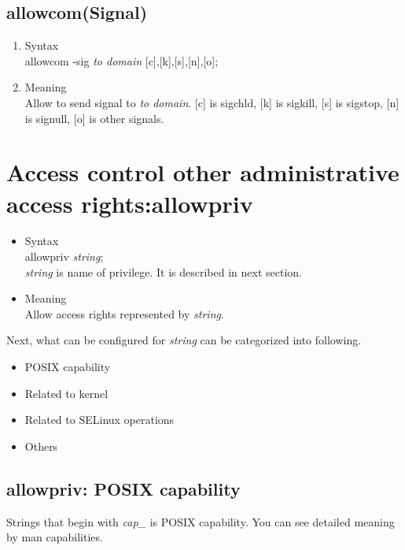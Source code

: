 \documentclass{article}
\begin{document}
\subsection{allowcom(Signal)}
\begin{enumerate}
 \item Syntax\\
       allowcom -sig {\it to domain} [c],[k],[s],[n],[o];
 \item Meaning\\
       Allow to send signal to {\it to domain}. [c] is sigchld, [k] is
       sigkill, [s] is sigstop, [n] is signull, [o] is other signals. 
\end{enumerate}



\section{Access control other administrative access
  rights:allowpriv}
\begin{itemize}
 \item Syntax \\
       allowpriv {\it string};\\
       {\it string} is name  of privilege. It is described in next section.
 \item Meaning \\
       Allow access rights represented by        {\it string}.
\end{itemize}
Next, 
what can be configured for {\it string} can be categorized into
following.
\begin{itemize}
 \item POSIX capability\\
 \item Related to kernel\\
 \item Related to SELinux operations\\
 \item Others
\end{itemize}


\subsection{allowpriv: POSIX capability}
Strings that begin with {\it cap\_} is POSIX capability. You can see
detailed meaning by man capabilities.
\end{document}
